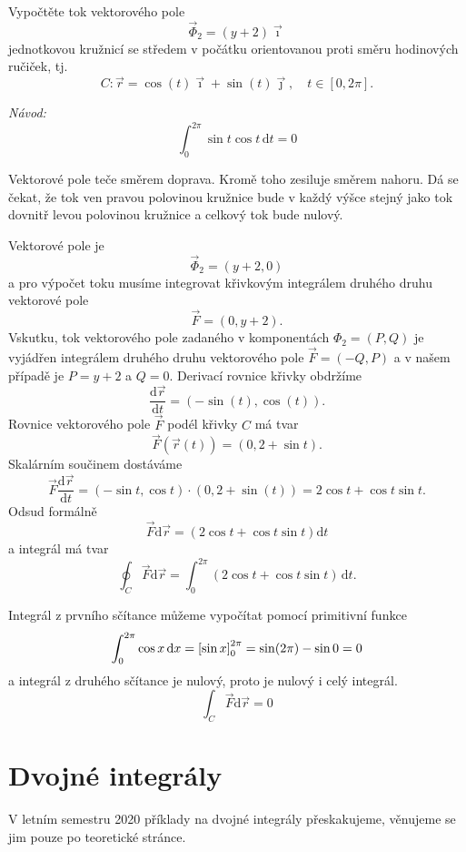 Vypočtěte tok vektorového pole $$\vec \Phi_2=(y+2)\vec\imath$$ jednotkovou kružnicí se středem v počátku orientovanou proti směru hodinových ručiček, tj. $$C\colon \vec r=\cos(t)\vec \imath+\sin(t)\vec\jmath, \quad t\in[0,2\pi].$$


\textit{Návod:} $$\int_0^{2\pi}\sin t\cos t\,\mathrm dt=0$$

\reseni
Vektorové pole teče směrem doprava. Kromě toho zesiluje směrem nahoru. Dá se čekat, že tok ven pravou polovinou kružnice bude v každý výšce stejný jako tok dovnitř levou polovinou kružnice a celkový tok bude nulový.

Vektorové pole je $$\vec \Phi_2=(y+2,0)$$ a pro výpočet toku musíme integrovat křivkovým integrálem druhého druhu vektorové pole $$\vec F=(0,y+2).$$
Vskutku, tok vektorového pole zadaného v komponentách $\Phi_2=(P,Q)$ je vyjádřen integrálem druhého druhu vektorového pole $\vec F=(-Q,P)$ a v našem případě je $P=y+2$ a $Q=0$. Derivací rovnice křivky obdržíme
$$\frac{\mathrm d\vec r}{\mathrm dt}=(-\sin (t),\cos (t)).$$
Rovnice vektorového pole $\vec F$ podél křivky $C$ má tvar
$$\vec F(\vec r(t))=(0,2+\sin t).$$
Skalárním součinem dostáváme
$$\vec F \frac{\mathrm d\vec r}{\mathrm dt}=
(-\sin t,\cos t)\cdot (0,2+\sin (t)) = 2\cos t+\cos t \sin t.
$$
Odsud formálně $$\vec F\mathrm d\vec r=(2\cos t+\cos t\sin t)\mathrm dt$$
a integrál má tvar
$$\oint_C\vec F\mathrm d\vec r=\int_0^{2\pi }(2\cos t+\cos t\sin t)\,\mathrm dt.$$

Integrál z prvního sčítance můžeme vypočítat pomocí primitivní funkce
$$\int_0^{2\pi} \cos x\,\mathrm dx=\qty[\sin x]_0^{2\pi}=\sin(2\pi)-\sin 0 =0$$ a integrál z druhého sčítance je nulový, proto je nulový i celý integrál.
$$\int_C\vec F\mathrm d\vec r=0$$


\konec


\stranka
\section{Dvojné integrály}

V letním semestru 2020 příklady na dvojné integrály přeskakujeme, věnujeme se jim pouze po teoretické stránce.





